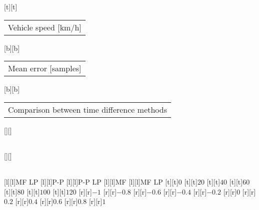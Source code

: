 %
[t][t]{\fontsize{8}{12}\selectfont \setlength{\tabcolsep}{0pt}\begin{tabular}{c}Vehicle speed [km/h]\end{tabular}}%
[b][b]{\fontsize{8}{12}\selectfont \setlength{\tabcolsep}{0pt}\begin{tabular}{c}Mean error [samples]\end{tabular}}%
[b][b]{\fontsize{8}{12}\selectfont \setlength{\tabcolsep}{0pt}\begin{tabular}{c}Comparison between time difference methods\end{tabular}}%
[][]{\fontsize{8}{12}\selectfont \setlength{\tabcolsep}{0pt}\begin{tabular}{c} \end{tabular}}%
[][]{\fontsize{4}{6}\selectfont \setlength{\tabcolsep}{0pt}\begin{tabular}{c} \end{tabular}}%
[l][l]{\fontsize{4}{6}\selectfont MF LP}%
[l][l]{\fontsize{4}{6}\selectfont P-P}%
[l][l]{\fontsize{4}{6}\selectfont P-P LP}%
[l][l]{\fontsize{4}{6}\selectfont MF}%
[l][l]{\fontsize{4}{6}\selectfont MF LP}%
%
\fontsize{6}{8}%
\selectfont%
%
[t][t]{$0$}%
[t][t]{$20$}%
[t][t]{$40$}%
[t][t]{$60$}%
[t][t]{$80$}%
[t][t]{$100$}%
[t][t]{$120$}%
%
[r][r]{$-1$}%
[r][r]{$-0.8$}%
[r][r]{$-0.6$}%
[r][r]{$-0.4$}%
[r][r]{$-0.2$}%
[r][r]{$0$}%
[r][r]{$0.2$}%
[r][r]{$0.4$}%
[r][r]{$0.6$}%
[r][r]{$0.8$}%
[r][r]{$1$}%
%
